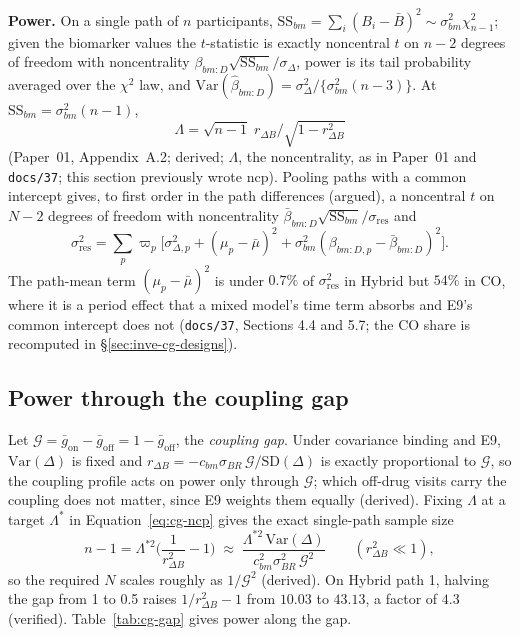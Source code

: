 \documentclass[11pt]{article}
\newcommand{\code}[1]{\texttt{#1}}
\begin{document}
\textbf{Power.} On a single path of $n$ participants,
$\mathrm{SS}_{bm} = \sum_i(B_i - \bar B)^2 \sim \sigma_{bm}^2\chi^2_{n-1}$;
given the biomarker values the $t$-statistic is exactly noncentral $t$
on $n-2$ degrees of freedom with noncentrality
$\beta_{bm:D}\sqrt{\mathrm{SS}_{bm}}/\sigma_\Delta$, power is its tail
probability averaged over the $\chi^2$ law, and
$\mathrm{Var}(\hat\beta_{bm:D}) = \sigma_\Delta^2/\{\sigma_{bm}^2(n-3)\}$. At
$\mathrm{SS}_{bm} = \sigma_{bm}^2(n-1)$,
\begin{equation}
\Lambda = \sqrt{n-1}\; r_{\Delta B}\big/\sqrt{1 - r_{\Delta B}^2}
\label{eq:cg-ncp}
\end{equation}
(Paper~01, Appendix~A.2; derived; $\Lambda$, the noncentrality, as in
Paper~01 and \code{docs/37}; this section previously wrote
$\mathrm{ncp}$).
Pooling paths with a common intercept gives, to first order in the
path differences (argued), a noncentral $t$ on $N-2$ degrees of
freedom with noncentrality
$\bar\beta_{bm:D}\sqrt{\mathrm{SS}_{bm}}/\sigma_{\mathrm{res}}$ and
\begin{equation}
\sigma^2_{\mathrm{res}} = \sum_p \varpi_p\big[\sigma_{\Delta,p}^2 + (\mu_p - \bar\mu)^2
  + \sigma_{bm}^2(\beta_{bm:D,p} - \bar\beta_{bm:D})^2\big].
\label{eq:cg-pooled}
\end{equation}
The path-mean term $(\mu_p - \bar\mu)^2$ is under $0.7\%$ of
$\sigma^2_{\mathrm{res}}$ in Hybrid but $54\%$ in CO, where it is a
period effect that a mixed model's time term absorbs and E9's common
intercept does not (\code{docs/37}, Sections 4.4 and 5.7; the CO
share is recomputed in \S\ref{sec:inve-cg-designs}).

\subsection{Power through the coupling gap}
\label{sec:cg-gap}

Let $\mathcal G = \bar g_{\mathrm{on}} - \bar g_{\mathrm{off}}
= 1 - \bar g_{\mathrm{off}}$, the \emph{coupling gap}. Under covariance
binding and E9, $\mathrm{Var}(\Delta)$ is fixed and
$r_{\Delta B} = -c_{bm}\sigma_{BR}\,\mathcal G/\mathrm{SD}(\Delta)$ is
exactly proportional to $\mathcal G$, so the coupling profile acts on
power only through $\mathcal G$; which off-drug visits carry the
coupling does not matter, since E9 weights them equally (derived).
Fixing $\Lambda$ at a target $\Lambda^\ast$ in
Equation~\eqref{eq:cg-ncp} gives the exact single-path sample size
\begin{equation}
n - 1 = \Lambda^{\ast2}\Big(\frac{1}{r_{\Delta B}^2} - 1\Big)
  \;\approx\; \frac{\Lambda^{\ast2}\,\mathrm{Var}(\Delta)}
  {c_{bm}^2\sigma_{BR}^2\,\mathcal G^{2}}
  \qquad (r_{\Delta B}^2 \ll 1),
\label{eq:cg-n-gap}
\end{equation}
so the required $N$ scales roughly as $1/\mathcal G^2$ (derived). On
Hybrid path 1, halving the gap from 1 to 0.5 raises
$1/r_{\Delta B}^2 - 1$ from $10.03$ to $43.13$, a factor of $4.3$
(verified). Table~\ref{tab:cg-gap} gives power along the gap.
\end{document}
